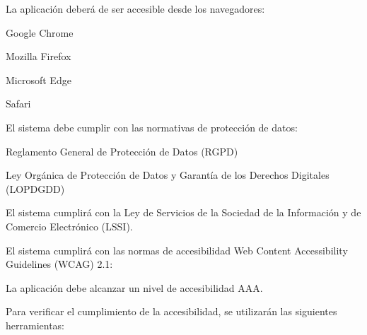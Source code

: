 
\begin{RNF}
	\item La aplicación deberá de ser accesible desde los navegadores:
	\begin{RNF}
		\item Google Chrome
		\item Mozilla Firefox
		\item Microsoft Edge
		\item Safari
	\end{RNF}

	\item El sistema debe cumplir con las normativas de protección de datos:
	\begin{RNF}
		\item Reglamento General de Protección de Datos (RGPD)
		\item Ley Orgánica de Protección de Datos y Garantía de los Derechos Digitales (LOPDGDD)
	\end{RNF}
	\item El sistema cumplirá con la Ley de Servicios de la Sociedad de la Información y de Comercio Electrónico (LSSI).
	\item El sistema cumplirá con las normas de accesibilidad Web Content Accessibility Guidelines (WCAG) 2.1:
	\begin{RNF}
		\item La aplicación debe alcanzar un nivel de accesibilidad AAA.
		\begin{RNF}
			\item Para verificar el cumplimiento de la accesibilidad, se utilizarán las siguientes herramientas:
			\begin{RNF}
				\item {}
				\item {}
				\item {}
			\end{RNF}
		\end{RNF}
	\end{RNF}



\end{RNF}

